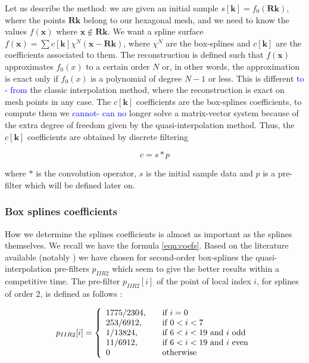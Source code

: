 \documentclass[proc]{edpsmath}
\begin{document}
Let us describe the method: we are given an initial sample $s[\mathbf{k}] = f_0(\mathbf{R} \mathbf{k})$, where the points $\mathbf{R} \mathbf{k}$ belong to our hexagonal mesh, and we need to know the values $f(\mathbf{x})$ where $\mathbf{x} \notin \mathbf{R} \mathbf{k}$. We want a spline surface $f(\mathbf{x}) = \sum c[\mathbf{k}] \chi^N(\mathbf{x} - \mathbf{R}\mathbf{k})$, where $\chi^N$ are the box-splines and $c[\mathbf{k}]$ are the coefficients associated to them. The reconstruction is defined such that $f(\mathbf{x})$ approximates $f_0(x)$ to a certain order $N$ or, in other words, the approximation is exact only if $f_0(x)$ is a polynomial of degree $N-1$ or less. This is different \textcolor{blue}{to - from} the classic interpolation method, where the reconstruction is exact on mesh points in any case. The $c[\mathbf{k}]$ coefficients are the box-splines coefficients, to compute them we \textcolor{blue}{cannot- can no} longer solve a matrix-vector system because of the extra degree of freedom given by the quasi-interpolation method. Thus, the  $c[\mathbf{k}]$ coefficients are obtained by discrete filtering\cite{Condat2006a}

\begin{equation}
\label{eqn:coefs}
 c = s * p
\end{equation}

where $*$ is the convolution operator, $s$ is the initial sample data and $p$ is a pre-filter which will be defined later on.


\subsubsection{Box splines coefficients}

How we determine the splines coefficients is almost as important as the splines themselves. We recall we have the formula \eqref{eqn:coefs}. Based on the literature available (notably \cite{Condat2007}) we have chosen for second-order box-splines the quasi-interpolation pre-filters $p_{IIR2}$ which seem to give the better results within a competitive time. The pre-filter $p_{IIR2}[i]$ of the point of local index $i$, for splines of order 2, is defined as follows : 


\begin{equation}
\label{eqn:filterIIR2}
p_{IIR2} [i] = \left\{
  \begin{array}{l l}
    1775/2304\text{,} & \quad \text{if } i = 0\\
    253/6912\text{,} & \quad \text{if } 0<i<7\\
    1/13824\text{,} & \quad \text{if } 6<i<19 \text{ and $i$ odd}\\
    11/6912\text{,} & \quad \text{if } 6<i<19 \text{ and $i$ even}\\
    0 & \quad \text{otherwise}
  \end{array} \right.
\end{equation}
\end{document}
